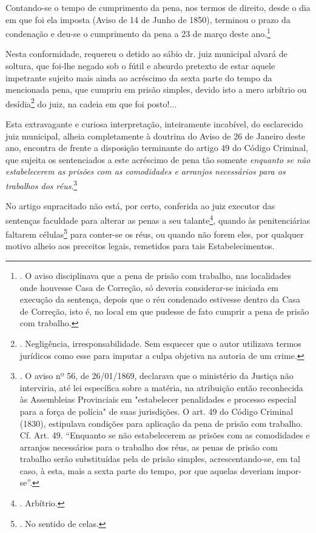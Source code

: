 Contando-se o tempo de cumprimento da pena, nos termos de direito, desde
o dia em que foi ela imposta (Aviso de 14 de Junho de 1850), terminou o
prazo da condenação e deu-se o cumprimento da pena a 23 de março deste
ano.\footnote{. O aviso disciplinava que a pena de prisão com trabalho,
  nas localidades onde houvesse Casa de Correção, só deveria
  considerar-se iniciada em execução da sentença, depois que o réu
  condenado estivesse dentro da Casa de Correção, isto é, no local em
  que pudesse de fato cumprir a pena de prisão com trabalho.}

Nesta conformidade, requereu o detido ao sábio dr. juiz municipal alvará
de soltura, que foi-lhe negado sob o fútil e absurdo pretexto de estar
aquele impetrante sujeito mais ainda ao acréscimo da sexta parte do
tempo da mencionada pena, que cumpriu em prisão simples, devido isto a
mero arbítrio ou desídia\footnote{. Negligência, irresponsabilidade. Sem
  esquecer que o autor utilizava termos jurídicos como esse para imputar
  a culpa objetiva na autoria de um crime.} do juiz, na cadeia em que
foi posto!...

Esta extravagante e curiosa interpretação, inteiramente incabível, do
esclarecido juiz municipal, alheia completamente à doutrina do Aviso de
26 de Janeiro deste ano, encontra de frente a disposição terminante do
artigo 49 do Código Criminal, que sujeita os sentenciados a este
acréscimo de pena tão somente \emph{enquanto se não estabelecerem as
prisões com as comodidades e arranjos necessários para os trabalhos dos
réus}.\footnote{. O aviso nº 56, de 26/01/1869, declarava que o
  ministério da Justiça não interviria, até lei específica sobre a
  matéria, na atribuição então reconhecida às Assembleias Provinciais em
  "estabelecer penalidades e processo especial para a força de polícia"
  de suas jurisdições. O art. 49 do Código Criminal (1830), estipulava
  condições para aplicação da pena de prisão com trabalho. Cf. Art. 49.
  ``Enquanto se não estabelecerem as prisões com as comodidades e
  arranjos necessários para o trabalho dos réus, as penas de prisão com
  trabalho serão substituídas pela de prisão simples, acrescentando-se,
  em tal caso, à esta, mais a sexta parte do tempo, por que aquelas
  deveriam impor-se''.}

No artigo supracitado não está, por certo, conferida ao juiz executor
das sentenças faculdade para alterar as penas a seu talante\footnote{.
  Arbítrio.}, quando às penitenciárias faltarem células\footnote{. No
  sentido de celas.} para conter-se os réus, ou quando não forem eles,
por qualquer motivo alheio aos preceitos legais, remetidos para tais
Estabelecimentos.

